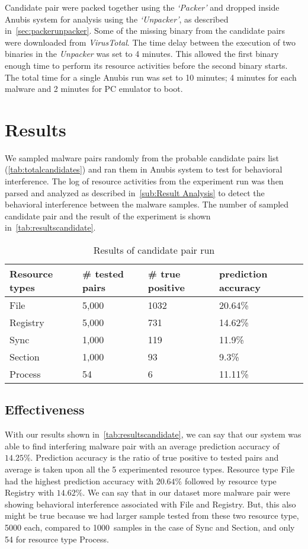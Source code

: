 Candidate pair were packed together using the \emph{`Packer'} and dropped inside Anubis system for analysis using the \emph{`Unpacker'}, as described in~\ref{sec:packerunpacker}.
Some of the missing binary from the candidate pairs were downloaded from \emph{VirusTotal}.
The time delay between the execution of two binaries in the \emph{Unpacker} was set to 4 minutes.
This allowed the first binary enough time to perform its resource activities before the second binary starts.
The total time for a single Anubis run was set to 10 minutes; 4 minutes for each malware and 2 minutes for PC emulator to boot.
\section{Results}
\label{sec:Results}
We sampled malware pairs randomly from the probable candidate pairs list (\autoref{tab:totalcandidates}) and ran them in Anubis system to test for behavioral interference.
The log of resource activities from the experiment run was then parsed and analyzed as described in~\autoref{sub:Result Analysis} to detect the behavioral interference between the malware samples.
The number of sampled candidate pair and the result of the experiment is shown in~\autoref{tab:resultscandidate}.
\begin{table}[ht]
  \caption[Results of candidate pair run]{Results of candidate pair run}\label{tab:resultscandidate}
  \centering
  \begin{tabular}{l l l l}
    \toprule
    Resource types & \# tested pairs & \# true positive & prediction accuracy\\
    \midrule
    File & 5,000 & 1032& 20.64\%\\
    Registry & 5,000 & 731& 14.62\%\\
    Sync & 1,000 & 119& 11.9\%\\
    Section & 1,000 & 93& 9.3\%\\
    Process & 54 & 6& 11.11\%\\
    \bottomrule
  \end{tabular}
\end{table}
\subsection{Effectiveness}
\label{sub:Effectiveness}
With our results shown in~\autoref{tab:resultscandidate}, we can say that our system was able to find interfering malware pair with an average prediction accuracy of $14.25\%$.
Prediction accuracy is the ratio of true positive to tested pairs and average is taken upon all the 5 experimented resource types.
Resource type File had the highest prediction accuracy with $20.64\%$ followed by resource type Registry with $14.62\%$.
We can say that in our dataset more malware pair were showing behavioral interference associated with File and Registry.
But, this also might be true because we had larger sample tested from these two resource type, 5000 each, compared to 1000\ samples in the case of Sync and Section, and only 54 for resource type Process.
